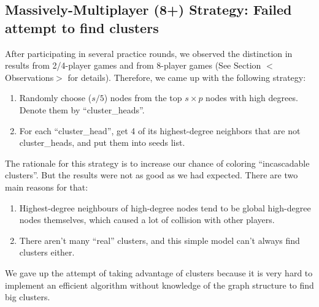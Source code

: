 \documentclass[12pt]{article}
\begin{document}
\subsection{Massively-Multiplayer (8+) Strategy: Failed attempt to find clusters}
After participating in several practice rounds, we observed the distinction in results from 2/4-player games and from 8-player games (See Section $<$Observations$>$ for details). Therefore, we came up with the following strategy:
\begin{enumerate}
\item Randomly choose ($s/5$) nodes from the top $s \times p$ nodes with high degrees. Denote them by ``cluster\_heads''. 
\item For each ``cluster\_head'', get 4 of its highest-degree neighbors that are not  cluster\_heads, and put them into seeds list. 
\end{enumerate}
The rationale for this strategy is to increase our chance of coloring ``incascadable clusters''. But the results were not as good  as we had expected. There are two main reasons for that:
\begin{enumerate}
\item Highest-degree neighbours of high-degree nodes tend to be global high-degree nodes themselves, which caused a lot of collision with other players.
\item There aren't many ``real'' clusters, and this simple model can't always find clusters either. 
\end{enumerate}
We gave up the attempt of taking advantage of clusters because it is very hard to implement an efficient algorithm without knowledge of the graph structure to find big clusters.  
\end{document}
